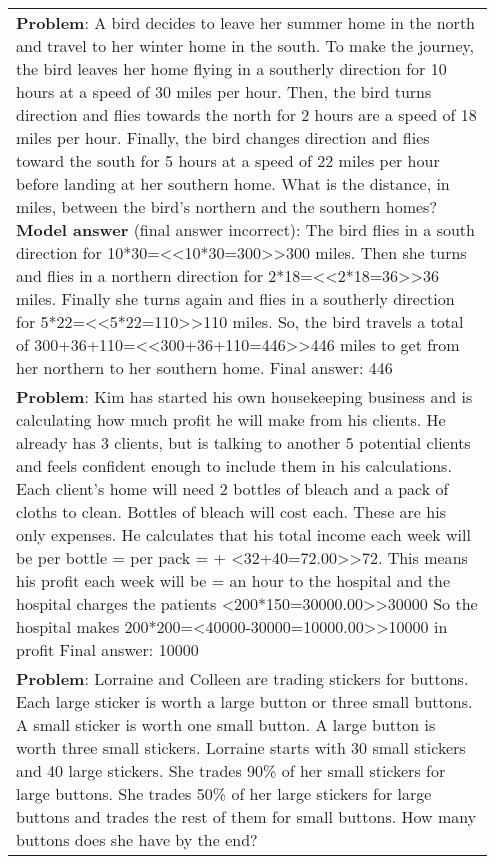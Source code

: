 \documentclass[11pt, a4paper, logo]{deepmind}
\begin{document}
{\begin{longtable}{p{0.95\linewidth}}
{\small \textbf{Problem}: A bird decides to leave her summer home in the north and travel to her winter home in the south.  To make the journey, the bird leaves her home flying in a southerly direction for 10 hours at a speed of 30 miles per hour.  Then, the bird turns direction and flies towards the north for 2 hours are a speed of 18 miles per hour.  Finally, the bird changes direction and flies toward the south for 5 hours at a speed of 22 miles per hour before landing at her southern home.  What is the distance, in miles, between the bird's northern and the southern homes? \newline
\textbf{Model answer} (final answer incorrect): The bird flies in a south direction for 10*30=<<10*30=300>>300 miles. \newline
Then she turns and flies in a northern direction for 2*18=<<2*18=36>>36 miles. \newline
Finally she turns again and flies in a southerly direction for 5*22=<<5*22=110>>110 miles. \newline
So, the bird travels a total of 300+36+110=<<300+36+110=446>>446 miles to get from her northern to her southern home. \newline
Final answer:  446} \newline \\
{\small \textbf{Problem}: Kim has started his own housekeeping business and is calculating how much profit he will make from his clients. He already has 3 clients, but is talking to another 5 potential clients and feels confident enough to include them in his calculations. Each client’s home will need 2 bottles of bleach and a pack of cloths to clean. Bottles of bleach will cost \5 each. These are his only expenses. He calculates that his total income each week will be \2 per bottle = \5 per pack = \32 + \<<32+40=72.00>>72. \newline
This means his profit each week will be \72 = \150 an hour to the hospital and the hospital charges the patients \<<200*150=30000.00>>30000 \newline
So the hospital makes 200*200=\<<40000-30000=10000.00>>10000 in profit \newline
Final answer:  10000} \newline \\
{\small \textbf{Problem}: Lorraine and Colleen are trading stickers for buttons. Each large sticker is worth a large button or three small buttons. A small sticker is worth one small button. A large button is worth three small stickers. Lorraine starts with 30 small stickers and 40 large stickers. She trades 90\% of her small stickers for large buttons. She trades 50\% of her large stickers for large buttons and trades the rest of them for small buttons. How many buttons does she have by the end? \newline
}
\end{longtable}}
\end{document}
